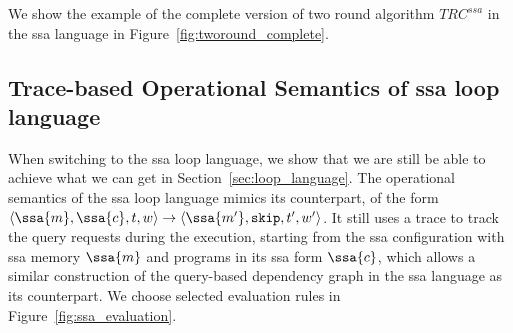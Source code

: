 We show the example of the complete version of two round algorithm $TRC^{ssa}$ in the ssa language in Figure~\ref{fig:tworound_complete}.

\subsection{Trace-based Operational Semantics of ssa loop language}
When switching to the ssa loop language, we show that we are still be able to achieve what we can get in Section~\ref{sec:loop_language}. The operational semantics of the ssa loop language mimics its counterpart, of the form $\config{\ssa{m}, \ssa{c}, t, w} \to \config{\ssa{m'}, \eskip, t', w'}$. It still uses a trace to track the query requests during the execution, starting from the ssa configuration with ssa memory $\ssa{m}$ and programs in its ssa form $\ssa{c}$, which allows a similar construction of the query-based dependency graph in the ssa language as its counterpart. We choose selected evaluation rules in Figure~\ref{fig:ssa_evaluation}.

